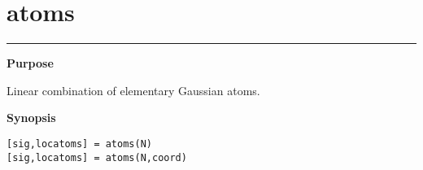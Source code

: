 


\section*{\hspace*{-1.6cm} atoms}

\vspace*{-.4cm}
\hspace*{-1.6cm}\rule[0in]{16.5cm}{.02cm}
\vspace*{.2cm}



{\bf \large \sf Purpose}\\
\hspace*{1.5cm}
\begin{minipage}[t]{13.5cm}
Linear combination of elementary Gaussian atoms.
\end{minipage}
\vspace*{.5cm}

{\bf \large \sf Synopsis}\\
\hspace*{1.5cm}
\begin{minipage}[t]{13.5cm}
\begin{verbatim}
[sig,locatoms] = atoms(N)
[sig,locatoms] = atoms(N,coord)
\end{verbatim}
\end{minipage}
\vspace*{.5cm}


